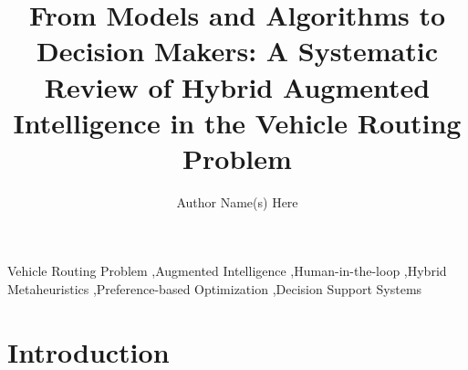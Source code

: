 \documentclass[preprint,12pt]{elsarticle}
\begin{document}
	
	\begin{frontmatter}
		
		\title{From Models and Algorithms to Decision Makers: A Systematic Review of Hybrid Augmented Intelligence in the Vehicle Routing Problem}
		
		
		\author{Author Name(s) Here}
		
		\begin{abstract}
		\end{abstract}
		
		\begin{keyword}
			Vehicle Routing Problem \sep Augmented Intelligence \sep Human-in-the-loop \sep Hybrid Metaheuristics \sep Preference-based Optimization \sep Decision Support Systems
		\end{keyword}
		
	\end{frontmatter}
	
	\section{Introduction}
	
\end{document}

